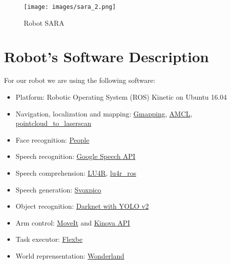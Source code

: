 \begin{wrapfigure}[10]{r}{0.25\textwidth}
	\centering
	\texttt{[image: images/sara\_2.png]}
	\caption{Robot SARA}
\end{wrapfigure}
\section*{Robot's Software Description}

For our robot we are using the following software:

\begin{itemize}
	\item Platform: Robotic Operating System (ROS) Kinetic on Ubuntu 16.04
	\item Navigation, localization and mapping: \href{http://wiki.ros.org/gmapping}{Gmapping}, \href{http://wiki.ros.org/amcl}{AMCL}, \href{http://wiki.ros.org/pointcloud_to_laserscan}{pointcloud\_to\_laserscan}
	\item Face recognition: \href{http://wiki.ros.org/people}{People}
	\item Speech recognition: \href{https://github.com/WalkingMachine/lab_ros_speech_to_text}{Google Speech API}
	\item Speech comprehension: \href{http://sag.art.uniroma2.it/lu4r.html}{LU4R}, \href{https://github.com/WalkingMachine/lu4r_ros}{lu4r\_ros}
	\item Speech generation: \href{https://doc.ubuntu-fr.org/svoxpico}{Svoxpico}
	\item Object recognition: \href{https://github.com/WalkingMachine/wm_darknet}{Darknet with YOLO v2 }
	\item Arm control: \href{http://wiki.ros.org/moveit}{MoveIt} and \href{https://github.com/Kinovarobotics/kinova-ros}{Kinova API}
	\item Task executor: \href{http://wiki.ros.org/flexbe}{Flexbe} 
	\item World reprensentation: \href{http://github.com/walkingmachine/wonderland}{Wonderland}
\end{itemize}
